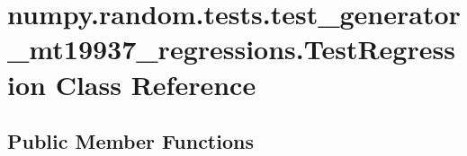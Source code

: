 \hypertarget{classnumpy_1_1random_1_1tests_1_1test__generator__mt19937__regressions_1_1TestRegression}{}\section{numpy.\+random.\+tests.\+test\+\_\+generator\+\_\+mt19937\+\_\+regressions.\+Test\+Regression Class Reference}
\label{classnumpy_1_1random_1_1tests_1_1test__generator__mt19937__regressions_1_1TestRegression}
\subsection*{Public Member Functions}
